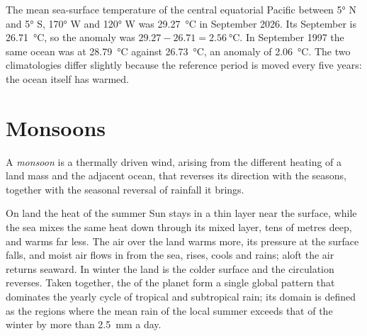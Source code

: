 \begin{example}[An anomaly]\label{ex:b2:climate-variability:anomaly}
The mean sea-surface temperature of the central equatorial Pacific between \ang{5} N and
\ang{5} S, \ang{170} W and \ang{120} W was \qty{29.27}{\celsius} in September 2026. Its September
 is \qty{26.71}{\celsius}, so the anomaly was $29.27 - 26.71 = \qty{2.56}{\celsius}$.
In September 1997 the same ocean was at \qty{28.79}{\celsius} against \qty{26.73}{\celsius}, an
anomaly of \qty{2.06}{\celsius}. The two climatologies differ slightly because the reference
period is moved every five years: the ocean itself has warmed.
\end{example}

\section{Monsoons}\label{sec:b2:climate-variability:monsoons}

\begin{definition}[Monsoon]\label{def:b2:climate-variability:monsoon}
A \emph{monsoon} is a thermally driven wind, arising from the different heating of
a land mass and the adjacent ocean, that reverses its direction with the seasons, together with
the seasonal reversal of rainfall it brings.
\end{definition}

On land the heat of the summer Sun stays in a thin layer near the surface, while the sea mixes
the same heat down through its mixed layer, tens of metres deep, and warms far less. The air over
the land warms more, its pressure at the surface falls, and moist air flows in from the sea, rises, cools and
rains; aloft the air returns seaward. In winter the land is the colder surface and the circulation
reverses. Taken together, the  of the planet form a single global pattern that dominates the yearly
cycle of tropical and subtropical rain; its domain is defined as the regions where the mean rain
of the local summer exceeds that of the winter by more than \qty{2.5}{mm} a day.

